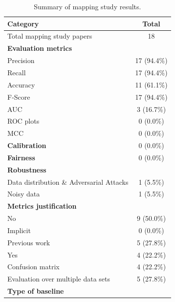 \documentclass[a4paper]{article}
\begin{document}
\begin{table}[H]
	\centering
	\captionsetup{justification=centering}
	\caption{Summary of mapping study results.}
	\begin{tabularx}{0.7\textwidth}{|X|c|}
		\hline
		\textbf{Category} & \textbf{Total} \\
		\hline
		Total mapping study papers & 18 \\
		\hline
		\textbf{Evaluation metrics} & \\
		\hspace{3mm} Precision & 17 (94.4\%)  \\
		\hspace{3mm} Recall & 17 (94.4\%) \\
		\hspace{3mm} Accuracy & 11 (61.1\%) \\
		\hspace{3mm} F-Score & 17 (94.4\%)\\
		\hspace{3mm} AUC & 3 (16.7\%) \\
		\hspace{3mm} ROC plots & 0 (0.0\%) \\
		\hspace{3mm} MCC & 0 (0.0\%) \\
		\textbf{Calibration} & 0 (0.0\%) \\
		\textbf{Fairness} &  0 (0.0\%) \\
		\textbf{Robustness} &  \\
		\hspace{3mm} Data distribution \& Adversarial Attacks & 1 (5.5\%)  \\
		\hspace{3mm} Noisy data & 1 (5.5\%) \\
		\textbf{Metrics justification} &\\
		\hspace{3mm} No & 9 (50.0\%) \\
		\hspace{3mm} Implicit & 0 (0.0\%) \\
		\hspace{3mm} Previous work & 5 (27.8\%) \\
		\hspace{3mm} Yes & 4 (22.2\%) \\
		Confusion matrix & 4 (22.2\%) \\
		Evaluation over multiple data sets & 5 (27.8\%) \\
		\textbf{Type of baseline} &\\

\end{tabularx}
\end{table}
\end{document}
